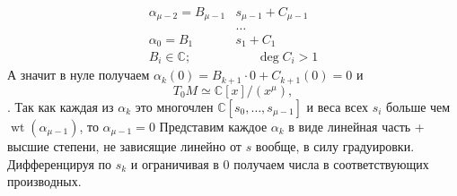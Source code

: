 \begin{align*}
	\alpha_{\mu - 2} = B_{\mu - 1}&s_{\mu - 1} + C_{\mu -1}\\
	&\dots\\
	\alpha_{0} = B_{1}&s_{1} + C_{1}\\
	B_i \in \mathbb{C};\hspace{20pt}& \hspace{20pt}\operatorname{deg}C_i > 1
\end{align*}
А значит в нуле получаем \(\alpha_k(0) = B_{k+1} \cdot 0 + C_{k+1}(0) = 0\) и
\[
T_0M \simeq \mathbb C[x]/(x^\mu),
\].
\fi
Так как каждая из \(\alpha_k\) это многочлен \(\mathbb{C}[s_0, \dots, s_{\mu-1}]\) и веса всех \(s_i\) больше чем \(\operatorname{wt}(\alpha_{\mu - 1})\), то \(\alpha_{\mu - 1} = 0\) Представим каждое \(\alpha_k\) в виде линейная часть + высшие степени, не зависящие линейно от \(s\) вообще, в силу градуировки.  Дифференцируя по \(s_k\) и ограничивая в 0 получаем числа в соответствующих производных. 

